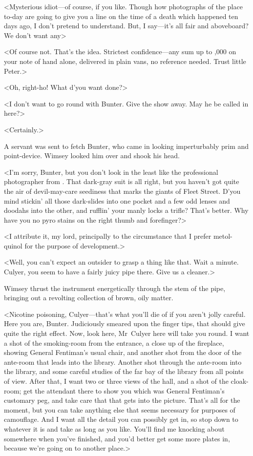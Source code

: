 <Mysterious idiot—of course, if you like. Though how photographs of the place to-day are going to give you a line on the time of a death which happened ten days ago, I don't pretend to understand. But, I say—it's all fair and aboveboard? We don't want any\longdash>

<Of course not. That's the idea. Strictest confidence—any sum up to ,000 on your note of hand alone, delivered in plain vans, no reference needed. Trust little Peter.>

<Oh, right-ho! What d'you want done?>

<I don't want to go round with Bunter. Give the show away. May he be called in here?>

<Certainly.>

A servant was sent to fetch Bunter, who came in looking imperturbably prim and point-device. Wimsey looked him over and shook his head.

<I'm sorry, Bunter, but you don't look in the least like the professional photographer from . That dark-gray suit is all right, but you haven't got quite the air of devil-may-care seediness that marks the giants of Fleet Street. D'you mind stickin' all those dark-slides into one pocket and a few odd lenses and doodahs into the other, and rufflin' your manly locks a trifle? That's better. Why have you no pyro stains on the right thumb and forefinger?>

<I attribute it, my lord, principally to the circumstance that I prefer metol-quinol for the purpose of development.>

<Well, you can't expect an outsider to grasp a thing like that. Wait a minute. Culyer, you seem to have a fairly juicy pipe there. Give us a cleaner.>

Wimsey thrust the instrument energetically through the stem of the pipe, bringing out a revolting collection of brown, oily matter.

<Nicotine poisoning, Culyer—that's what you'll die of if you aren't jolly careful. Here you are, Bunter. Judiciously smeared upon the finger tips, that should give quite the right effect. Now, look here, Mr~Culyer here will take you round. I want a shot of the smoking-room from the entrance, a close up of the fireplace, showing General Fentiman's usual chair, and another shot from the door of the ante-room that leads into the library. Another shot through the ante-room into the library, and some careful studies of the far bay of the library from all points of view. After that, I want two or three views of the hall, and a shot of the cloak-room; get the attendant there to show you which was General Fentiman's customary peg, and take care that that gets into the picture. That's all for the moment, but you can take anything else that seems necessary for purposes of camouflage. And I want all the detail you can possibly get in, so stop down to whatever it is and take as long as you like. You'll find me knocking about somewhere when you've finished, and you'd better get some more plates in, because we're going on to another place.>

